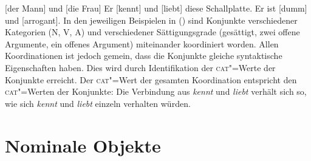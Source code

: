 \eal
\ex {}[der Mann] und [die Frau]
\ex Er [kennt] und [liebt] diese Schallplatte.
\ex Er ist [dumm] und [arrogant].
\zl
In den jeweiligen Beispielen in () sind Konjunkte verschiedener Kategorien (N, V, A) und 
verschiedener Sättigungsgrade (gesättigt,
zwei offene Argumente, ein offenes Argument) miteinander
koordiniert worden. Allen Koordinationen ist jedoch gemein, dass die Konjunkte gleiche syntaktische
Eigenschaften haben. Dies wird durch Identifikation der \textsc{cat}"=Werte der Konjunkte erreicht.
Der \textsc{cat}"=Wert der gesamten Koordination entspricht den \textsc{cat}"=Werten der Konjunkte:
Die Verbindung aus \emph{kennt} und \emph{liebt} verhält sich so, wie sich \emph{kennt} und \emph{liebt}
einzeln verhalten würden.


\section{Nominale Objekte}
\label{sec-index}

